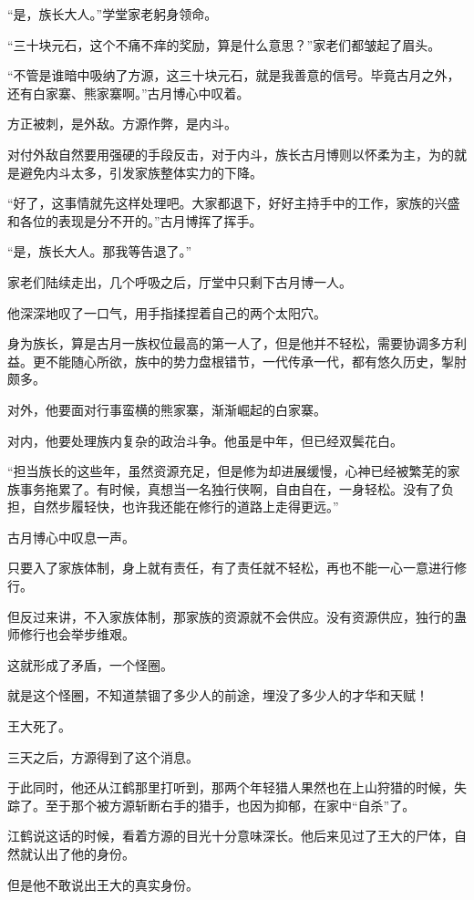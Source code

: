 \begin{this_body}
“是，族长大人。”学堂家老躬身领命。

“三十块元石，这个不痛不痒的奖励，算是什么意思？”家老们都皱起了眉头。

“不管是谁暗中吸纳了方源，这三十块元石，就是我善意的信号。毕竟古月之外，还有白家寨、熊家寨啊。”古月博心中叹着。

方正被刺，是外敌。方源作弊，是内斗。

对付外敌自然要用强硬的手段反击，对于内斗，族长古月博则以怀柔为主，为的就是避免内斗太多，引发家族整体实力的下降。

“好了，这事情就先这样处理吧。大家都退下，好好主持手中的工作，家族的兴盛和各位的表现是分不开的。”古月博挥了挥手。

“是，族长大人。那我等告退了。”

家老们陆续走出，几个呼吸之后，厅堂中只剩下古月博一人。

他深深地叹了一口气，用手指揉捏着自己的两个太阳穴。

身为族长，算是古月一族权位最高的第一人了，但是他并不轻松，需要协调多方利益。更不能随心所欲，族中的势力盘根错节，一代传承一代，都有悠久历史，掣肘颇多。

对外，他要面对行事蛮横的熊家寨，渐渐崛起的白家寨。

对内，他要处理族内复杂的政治斗争。他虽是中年，但已经双鬓花白。

“担当族长的这些年，虽然资源充足，但是修为却进展缓慢，心神已经被繁芜的家族事务拖累了。有时候，真想当一名独行侠啊，自由自在，一身轻松。没有了负担，自然步履轻快，也许我还能在修行的道路上走得更远。”

古月博心中叹息一声。

只要入了家族体制，身上就有责任，有了责任就不轻松，再也不能一心一意进行修行。

但反过来讲，不入家族体制，那家族的资源就不会供应。没有资源供应，独行的蛊师修行也会举步维艰。

这就形成了矛盾，一个怪圈。

就是这个怪圈，不知道禁锢了多少人的前途，埋没了多少人的才华和天赋！

王大死了。

三天之后，方源得到了这个消息。

于此同时，他还从江鹤那里打听到，那两个年轻猎人果然也在上山狩猎的时候，失踪了。至于那个被方源斩断右手的猎手，也因为抑郁，在家中“自杀”了。

江鹤说这话的时候，看着方源的目光十分意味深长。他后来见过了王大的尸体，自然就认出了他的身份。

但是他不敢说出王大的真实身份。


\end{this_body}
